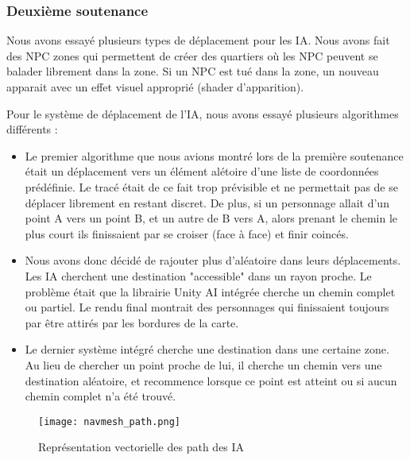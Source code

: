     \vspace{0.5cm}
    \subsubsection{Deuxième soutenance}
    \vspace{0.5cm}


        Nous avons essayé plusieurs types de déplacement pour les IA. Nous avons fait des NPC zones qui permettent de créer des quartiers
        où les NPC peuvent se balader librement dans la zone. Si un NPC est tué dans la zone, un nouveau apparait avec un effet visuel 
        approprié (shader d'apparition).
        

        Pour le système de déplacement de l'IA,
        nous avons essayé plusieurs algorithmes différents :
        
        \begin{itemize}
            \item Le premier algorithme que nous avions montré lors de la première soutenance
            était un déplacement vers un élément alétoire d'une liste de coordonnées prédéfinie.
            Le tracé était de ce fait trop prévisible et ne permettait pas de se déplacer librement en restant discret.
            De plus, si un personnage allait d'un point A vers un point B, et un autre de B vers A,
            alors prenant le chemin le plus court ils finissaient par se croiser (face à face) et finir coincés.
            
            \item Nous avons donc décidé de rajouter plus d'aléatoire dans leurs déplacements. Les IA cherchent 
            une destination "accessible" dans un rayon proche. Le problème était que la librairie Unity AI intégrée 
            cherche un chemin complet ou partiel. Le rendu final montrait des personnages qui finissaient toujours 
            par être attirés par les bordures de la carte.

            \item Le dernier système intégré cherche une destination dans une certaine zone.
            Au lieu de chercher un point proche de lui, il cherche un chemin vers une destination aléatoire, 
            et recommence lorsque ce point est atteint ou si aucun chemin complet n'a été trouvé.
        \end{itemize}
            

        \begin{figure}[hbt!]
            \centering
            \texttt{[image: navmesh\_path.png]}
            \caption{Représentation vectorielle des path des IA}
        \end{figure}
        \FloatBarrier
        
